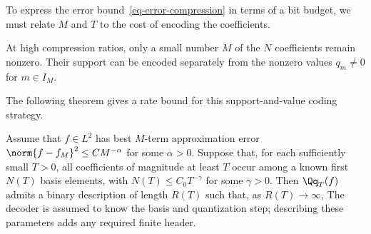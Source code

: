To express the error bound~\eqref{eq-error-compression} in terms of a bit budget, we must relate $M$ and $T$ to the cost of encoding the coefficients.

At high compression ratios, only a small number $M$ of the $N$ coefficients remain nonzero. Their support
can be encoded separately from the nonzero values $q_m \neq 0$ for $m \in I_M$.

The following theorem gives a rate bound for this support-and-value coding strategy.

\begin{thm}\label{thm-compression}
Assume that $f\in L^2$ has best $M$-term approximation error $\norm{f-f_M}^2\leq C M^{-\alpha}$ for some $\alpha>0$. Suppose that, for each sufficiently small $T>0$, all coefficients of magnitude at least $T$ occur among a known first $N(T)$ basis elements, with $N(T)\leq C_0T^{-\gamma}$ for some $\gamma>0$. Then $\Qq_T(f)$ admits a binary description of length $R(T)$ such that, as $R(T)\to\infty$,
The decoder is assumed to know the basis and quantization step; describing these parameters adds any required finite header.
\end{thm}

